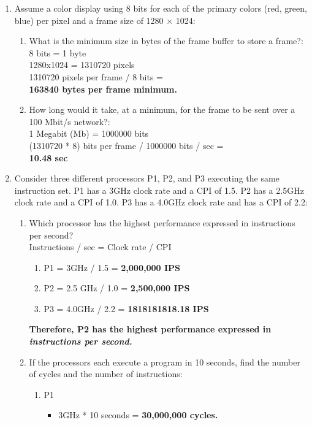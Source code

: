 \documentclass{article}
\begin{document}
\begin{enumerate}
\item Assume a color display using 8 bits for each of the primary colors (red, green, blue) per pixel and a frame size of 1280 × 1024:
\begin{enumerate}
    \item What is the minimum size in bytes of the frame buffer to store a frame?:\\
         8 bits = 1 byte\\
         1280x1024 = 1310720 pixels\\
         1310720 pixels per frame / 8 bits = \\
         \textbf{163840 bytes per frame minimum.}
    \item How long would it take, at a minimum, for the frame to be sent over a 100 Mbit/s network?:\\
        1 Megabit (Mb) = 1000000 bits\\
        (1310720 * 8) bits per frame / 1000000 bits / sec = \\
        \textbf{10.48 sec}
\end{enumerate}
\item Consider three different processors P1, P2, and P3 executing the same instruction set. P1 has a 3GHz clock rate and a CPI of 1.5. P2 has a 2.5GHz clock rate and a CPI of 1.0. P3 has a 4.0GHz clock rate and has a CPI of 2.2:
\begin{enumerate}
    \item Which processor has the highest performance expressed in instructions per second?\\
    Instructions / sec = Clock rate / CPI
    \begin{enumerate}
        \item P1 = 3GHz / 1.5 = \textbf{2,000,000 IPS}
        \item P2 = 2.5 GHz / 1.0 = \textbf{2,500,000 IPS}
        \item P3 = 4.0GHz / 2.2 = \textbf{1818181818.18 IPS}
    \end{enumerate}
    \textbf{Therefore, P2 has the highest performance expressed in \textit{instructions per second.}}
    \item If the processors each execute a program in 10 seconds, find the number of cycles and the number of instructions:
    \begin{enumerate}
        \item P1 \begin{itemize}
            \item 3GHz * 10 seconds = \textbf{30,000,000 cycles.}

\end{itemize}
\end{enumerate}
\end{enumerate}
\end{enumerate}
\end{document}
